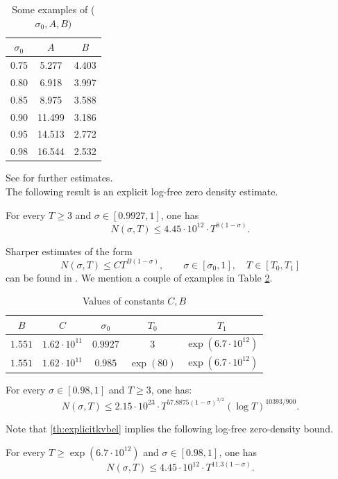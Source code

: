 \begin{table}[ht]
\centering
\begin{tabular}{|c|c|c|}
\hline
$\sigma_0$ & $A$ & $B$ \\
\hline
0.75 & 5.277 & 4.403 \\
0.80 & 6.918 & 3.997 \\
0.85 & 8.975 & 3.588 \\
0.90 & 11.499 & 3.186 \\
0.95 & 14.513 & 2.772 \\
0.98 & 16.544 & 2.532 \\
\hline
\end{tabular}
\caption{Some examples of ($\sigma_0, A, B)$}
\label{zerodensity_kadiri}
\end{table}
See \cite{Kadiri_explicit_2018} for further estimates.\\
The following result is an explicit log-free zero density estimate.
\begin{theorem}\label{th:explbellogfree}
For every $T\ge 3$ and $\sigma\in[0.9927,1]$, one has $$N(\sigma, T) \leq 4.45 \cdot 10^{12} \cdot T^{8(1-\sigma)}.$$
\end{theorem}
Sharper estimates of the form
$$N(\sigma,T)\le CT^{B(1-\sigma)},\qquad \sigma\in[\sigma_0,1],\quad T\in[T_0,T_1]$$ can be found in \cite{bellotti_2024}. We mention a couple of examples in Table \ref{table:bellottilogfree}.
\begin{table}[h]
\def\arraystretch{1.3}
\centering
\caption{Values of constants $C,B$}
\begin{tabular}{|c|c|c|c|c|}
\hline
 $B$ & $C$ & $\sigma_0$ & $T_0$ & $T_1$ \\
\hline
$1.551$ & $1.62\cdot 10^{11}$ & $0.9927$ & $3$ & $\exp(6.7\cdot 10^{12})$\\
\hline
$1.551$ & $1.62\cdot 10^{11}$ & $0.985$ & $\exp(80)$ & $\exp(6.7\cdot 10^{12})$\\
\hline
\end{tabular}
\label{table:bellottilogfree}
\end{table}
\begin{theorem}\label{th:explicitkvbel}
For every $\sigma\in[0.98,1]$ and $T\ge 3$, one has:\begin{equation*}
    N(\sigma,T)\le2.15\cdot 10^{23}\cdot T^{57.8875(1-\sigma)^{3/2}}(\log T)^{10393/900}.
\end{equation*}
\end{theorem}
Note that \cref{th:explicitkvbel} implies the following log-free zero-density bound.
\begin{corollary}\label{th:kvaslokgfreebel}
For every $T\ge \exp(6.7\cdot 10^{12})$ and $\sigma\in[0.98,1]$, one has$$N(\sigma, T) \leq 4.45 \cdot 10^{12} \cdot T^{11.3(1-\sigma)}.$$
\end{corollary}


